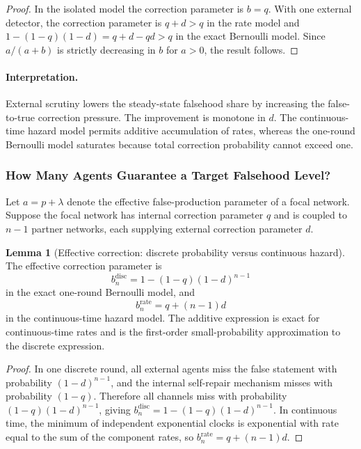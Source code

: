 \documentclass[12pt]{article}
\theoremstyle{definition}
\newtheorem{lemma}{Lemma}[section]
\begin{document}
\begin{proof}
In the isolated model the correction parameter is $b=q$.  With one external
detector, the correction parameter is $q+d>q$ in the rate model and
$1-(1-q)(1-d)=q+d-qd>q$ in the exact Bernoulli model.  Since $a/(a+b)$ is
strictly decreasing in $b$ for $a>0$, the result follows.
\end{proof}

\paragraph{Interpretation.}
External scrutiny lowers the steady-state falsehood share by increasing the
false-to-true correction pressure.  The improvement is monotone in $d$.  The
continuous-time hazard model permits additive accumulation of rates, whereas the
one-round Bernoulli model saturates because total correction probability cannot
exceed one.

\subsubsection{How Many Agents Guarantee a Target Falsehood Level?}
\label{sec:agent-requirements}

Let $a=p+\lambda$ denote the effective false-production parameter of a focal
network.  Suppose the focal network has internal correction parameter $q$ and is
coupled to $n-1$ partner networks, each supplying external correction parameter
$d$.

\begin{lemma}[Effective correction: discrete probability versus continuous hazard]
\label{lem:effective_hazard}
The effective correction parameter is
\[
    b_n^{\mathrm{disc}}=1-(1-q)(1-d)^{n-1}
\]
in the exact one-round Bernoulli model, and
\[
    b_n^{\mathrm{rate}}=q+(n-1)d
\]
in the continuous-time hazard model.  The additive expression is exact for
continuous-time rates and is the first-order small-probability approximation to
the discrete expression.
\end{lemma}

\begin{proof}
In one discrete round, all external agents miss the false statement with
probability $(1-d)^{n-1}$, and the internal self-repair mechanism misses with
probability $(1-q)$.  Therefore all channels miss with probability
$(1-q)(1-d)^{n-1}$, giving
$b_n^{\mathrm{disc}}=1-(1-q)(1-d)^{n-1}$.  In continuous time, the minimum of
independent exponential clocks is exponential with rate equal to the sum of the
component rates, so $b_n^{\mathrm{rate}}=q+(n-1)d$.
\end{proof}
\end{document}
